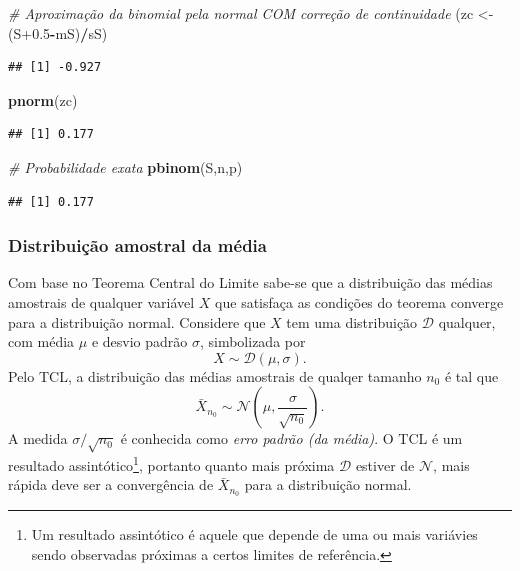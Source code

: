 \documentclass[
]{book}
\newenvironment{Shaded}{\begin{snugshade}}{\end{snugshade}}
\newcommand{\CommentTok}[1]{\textcolor[rgb]{0.56,0.35,0.01}{\textit{#1}}}
\newcommand{\FloatTok}[1]{\textcolor[rgb]{0.00,0.00,0.81}{#1}}
\newcommand{\KeywordTok}[1]{\textcolor[rgb]{0.13,0.29,0.53}{\textbf{#1}}}
\newcommand{\NormalTok}[1]{#1}
\newcommand{\OperatorTok}[1]{\textcolor[rgb]{0.81,0.36,0.00}{\textbf{#1}}}
\newcommand{\StringTok}[1]{\textcolor[rgb]{0.31,0.60,0.02}{#1}}
\theoremstyle{definition}
\theoremstyle{definition}
\theoremstyle{definition}
\theoremstyle{remark}
\begin{document}
\begin{Shaded}
\begin{Highlighting}[]
\CommentTok{\# Aproximação da binomial pela normal COM correção de continuidade}
\NormalTok{(zc \textless{}{-}}\StringTok{ }\NormalTok{(S}\FloatTok{+0.5}\OperatorTok{{-}}\NormalTok{mS)}\OperatorTok{/}\NormalTok{sS)}
\end{Highlighting}
\end{Shaded}

\begin{verbatim}
## [1] -0.927
\end{verbatim}

\begin{Shaded}
\begin{Highlighting}[]
\KeywordTok{pnorm}\NormalTok{(zc)}
\end{Highlighting}
\end{Shaded}

\begin{verbatim}
## [1] 0.177
\end{verbatim}

\begin{Shaded}
\begin{Highlighting}[]
\CommentTok{\# Probabilidade exata}
\KeywordTok{pbinom}\NormalTok{(S,n,p)}
\end{Highlighting}
\end{Shaded}

\begin{verbatim}
## [1] 0.177
\end{verbatim}

\hypertarget{distribuiuxe7uxe3o-amostral-da-muxe9dia}{%
\subsubsection*{Distribuição amostral da média}\label{distribuiuxe7uxe3o-amostral-da-muxe9dia}}

Com base no Teorema Central do Limite sabe-se que a distribuição das médias amostrais de qualquer variável \(X\) que satisfaça as condições do teorema converge para a distribuição normal. Considere que \(X\) tem uma distribuição \(\mathcal{D}\) qualquer, com média \(\mu\) e desvio padrão \(\sigma\), simbolizada por \[X \sim \mathcal{D}(\mu,\sigma).\] Pelo TCL, a distribuição das médias amostrais de qualqer tamanho \(n_0\) é tal que \[\bar{X}_{n_0} \sim \mathcal{N} \left( \mu,\frac{\sigma}{\sqrt{n_0}} \right).\] A medida \(\sigma/\sqrt{n_0}\) é conhecida como \emph{erro padrão (da média)}. O TCL é um resultado assintótico\footnote{Um resultado assintótico é aquele que depende de uma ou mais variávies sendo observadas próximas a certos limites de referência.}, portanto quanto mais próxima \(\mathcal{D}\) estiver de \(\mathcal{N}\), mais rápida deve ser a convergência de \(\bar{X}_{n_0}\) para a distribuição normal.
\end{document}
